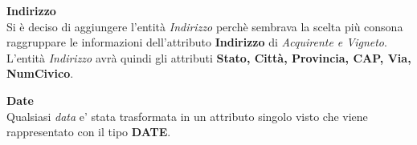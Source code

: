 \textbf{\large{Indirizzo}}\\
Si è deciso di aggiungere l'entità \emph{Indirizzo} perchè sembrava la scelta più consona raggruppare le informazioni dell'attributo \textbf{Indirizzo} di \emph{Acquirente e Vigneto}. L'entità \emph{Indirizzo} avrà quindi gli attributi \textbf{Stato, Città, Provincia, CAP, Via, NumCivico}.

\begin{flushleft}
\textbf{\large{Date}}\\
Qualsiasi \emph{data} e' stata trasformata in un attributo singolo visto che viene rappresentato con il tipo \textbf{DATE}.
\end{flushleft}

